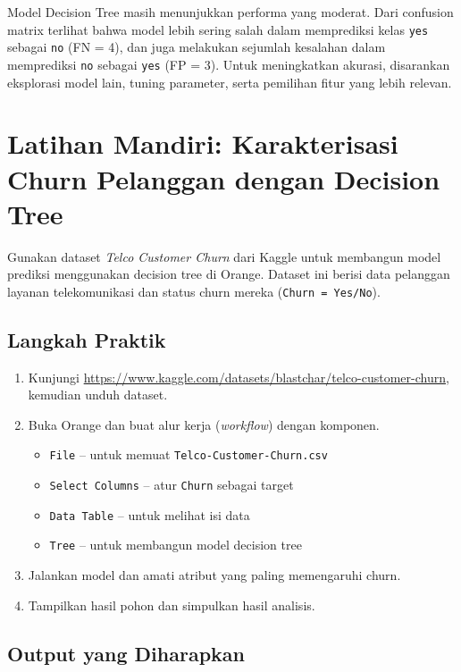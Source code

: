 Model Decision Tree masih menunjukkan performa yang moderat. Dari confusion matrix terlihat bahwa model lebih sering salah dalam memprediksi kelas \texttt{yes} sebagai \texttt{no} (FN = 4), dan juga melakukan sejumlah kesalahan dalam memprediksi \texttt{no} sebagai \texttt{yes} (FP = 3). Untuk meningkatkan akurasi, disarankan eksplorasi model lain, tuning parameter, serta pemilihan fitur yang lebih relevan.


\section{Latihan Mandiri: Karakterisasi Churn Pelanggan dengan Decision Tree}

Gunakan dataset \textit{Telco Customer Churn} dari Kaggle untuk membangun model prediksi menggunakan decision tree di Orange. Dataset ini berisi data pelanggan layanan telekomunikasi dan status churn mereka (\texttt{Churn = Yes/No}).

\subsection*{Langkah Praktik}

\begin{enumerate}
	\item Kunjungi \url{https://www.kaggle.com/datasets/blastchar/telco-customer-churn}, kemudian unduh dataset.
	\item Buka Orange dan buat alur kerja (\textit{workflow}) dengan komponen. 
	\begin{itemize}
		\item \texttt{File} – untuk memuat \texttt{Telco-Customer-Churn.csv}
		\item \texttt{Select Columns} – atur \texttt{Churn} sebagai target
		\item \texttt{Data Table} – untuk melihat isi data
		\item \texttt{Tree} – untuk membangun model decision tree
	\end{itemize}
	\item Jalankan model dan amati atribut yang paling memengaruhi churn.
	\item Tampilkan hasil pohon dan simpulkan hasil analisis.
\end{enumerate}

\subsection*{Output yang Diharapkan}

